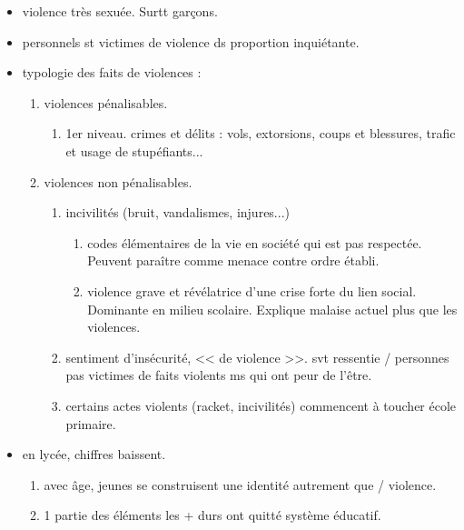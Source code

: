 \documentclass[12pt]{report}
\begin{document}
\begin{itemize}
\item violence très sexuée. Surtt garçons.\\

\item  personnels st victimes de violence ds proportion inquiétante.\\

\item typologie des faits de violences : 
\begin{enumerate}
\item violences pénalisables.
\begin{enumerate}
\item 1er niveau. crimes et délits : vols, extorsions, coups et blessures, trafic et usage de stupéfiants...\\
\end{enumerate}
\item violences non pénalisables.
\begin{enumerate}
\item incivilités (bruit, vandalismes, injures...)
\begin{enumerate}
\item codes élémentaires de la vie en société qui est pas respectée. Peuvent paraître comme menace contre ordre établi. \\
\item violence grave et révélatrice d'une crise forte du lien social. Dominante en milieu scolaire. Explique malaise actuel plus que les violences.\\
\end{enumerate}

\item sentiment d'insécurité, << de violence >>. svt ressentie / personnes pas victimes de faits violents ms qui ont peur de l'être.\\

\item certains actes violents (racket, incivilités) commencent à toucher école primaire.\\

\end{enumerate}
\end{enumerate}

\item en lycée, chiffres baissent.\\
\begin{enumerate}
\item avec âge, jeunes se construisent une identité autrement que / violence.\\
\item 1 partie des éléments les + durs ont quitté système éducatif.\\
\end{enumerate}


\end{itemize}
\end{document}
